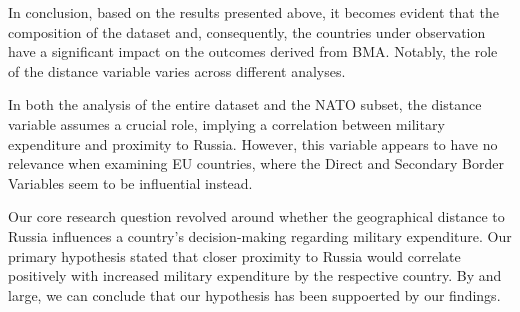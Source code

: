 \documentclass[12pt,a4paper]{article}
\begin{document}
In conclusion, based on the results presented above, it becomes evident that the composition of the dataset and, consequently, the countries under observation have a significant impact on the outcomes derived from BMA. Notably, the role of the distance variable varies across different analyses. 

In both the analysis of the entire dataset and the NATO subset, the distance variable assumes a crucial role, implying a correlation between military expenditure and proximity to Russia. However, this variable appears to have no relevance when examining EU countries, where the Direct and Secondary Border Variables seem to be influential instead.

Our core research question revolved around whether the geographical distance to Russia influences a country's decision-making regarding military expenditure. Our primary hypothesis stated that closer proximity to Russia would correlate positively with increased military expenditure by the respective country. By and large, we can conclude that our hypothesis has been suppoerted by our findings. \\
\end{document}
